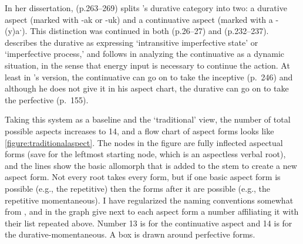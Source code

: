 In her dissertation, \citealt{rose1981} (p.263--269) splits \citeauthor{sapir1939}'s durative category into two: a durative aspect (marked with -ak or -uk) and a continuative aspect (marked with a -(y)aˑ). This distinction was continued in both \citealt{nakayama2001} (p.26--27) and \citealt{davidson2002} (p.232--237). \citeauthor{davidson2002} describes the durative as expressing `intransitive imperfective state' or `imperfective process,' and follows \citeauthor{rose1981} in analyzing the continuative as a dynamic situation, in the sense that energy input is necessary to continue the action. At least in \citeauthor{davidson2002}'s version, the continuative can go on to take the inceptive (p.\ 246) and although he does not give it in his aspect chart, the durative can go on to take the perfective (p.\ 155).

Taking this system as a baseline and the `traditional' view, the number of total possible aspects increases to 14, and a flow chart of aspect forms looks like \cref{figure:traditionalaspect}. The nodes in the figure are fully inflected aspectual forms (save for the leftmost starting node, which is an aspectless verbal root), and the lines show the basic allomorph that is added to the stem to create a new aspect form. Not every root takes every form, but if one basic aspect form is possible (e.g., the repetitive) then the forms after it are possible (e.g., the repetitive momentaneous). I have regularized the naming conventions somewhat from \citeauthor{sapir1939}, and in the graph give next to each aspect form a number affiliating it with their list repeated above. Number 13 is for the continuative aspect and 14 is for the durative-momentaneous. A box is drawn around perfective forms.

